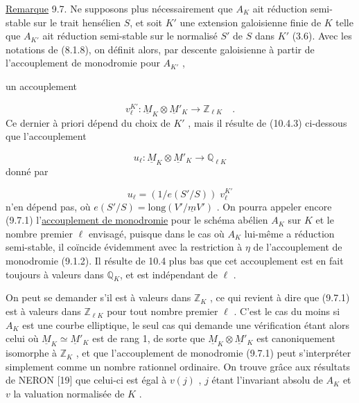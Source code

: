 \underline{Remarque} 9.7. Ne supposons plus nécessairement que $A_K$ ait réduction semi-stable sur le trait hensélien $S$, et soit $K'$ une extension galoisienne finie de $K$ telle que $A_{K'}$ ait réduction semi-stable sur le normalisé $S'$ de $S$ dans $K'$ (3.6). Avec les notations de (8.1.8), on définit alors, par descente galoisienne à partir de l'accouplement de monodromie pour $A_{K'}$ ,



un accouplement

\begin{equation}\tag{*}
v_\ell^{K'} : \underline{M}_K \otimes \underline{M}'_K \longrightarrow \mathbb{Z}_{\ell K} \quad .
\end{equation}
Ce dernier à priori dépend du choix de $K'$ , mais il résulte de (10.4.3) ci-dessous que l'accouplement

\begin{equation}\tag{9.7.1}
u_\ell : \underline{M}_K \otimes \underline{M}'_K \longrightarrow \mathbb{Q}_{\ell K}
\end{equation}
donné par

\begin{equation*}
u_\ell = (1/e(S'/S))\; v_\ell^{K'}
\end{equation*}
n'en dépend pas, où $e(S'/S) = \mathrm{long}(V'/\underline{m}V')$ . On pourra appeler encore (9.7.1) l'\underline{accouplement de monodromie} pour le schéma abélien $A_K$ sur $K$ et le nombre premier $\ell$ envisagé, puisque dans le cas où $A_K$ lui-même a réduction semi-stable, il coïncide évidemment avec la restriction à $\eta$ de l'accouplement de monodromie (9.1.2). Il résulte de 10.4 plus bas que cet accouplement est en fait toujours à valeurs dans $\mathbb{Q}_K$, et est indépendant de $\ell$ .

On peut se demander s'il est à valeurs dans $\mathbb{Z}_K$ , ce qui revient à dire que (9.7.1) est à valeurs dans $\mathbb{Z}_{\ell K}$ pour tout nombre premier $\ell$ . C'est le cas du moins si $A_K$ est une courbe elliptique, le seul cas qui demande une vérification étant alors celui où $\underline{M}_K \simeq \underline{M}'_K$ est de rang 1, de sorte que $\underline{M}_K \otimes \underline{M}'_K$ est canoniquement isomorphe à $\mathbb{Z}_K$ , et que l'accouplement de monodromie (9.7.1) peut s'interpréter simplement comme un nombre rationnel ordinaire. On trouve grâce aux résultats de NERON [19] que celui-ci est égal à $v(j)$ , $j$ étant l'invariant absolu de $A_K$ et $v$ la valuation normalisée de $K$ .


